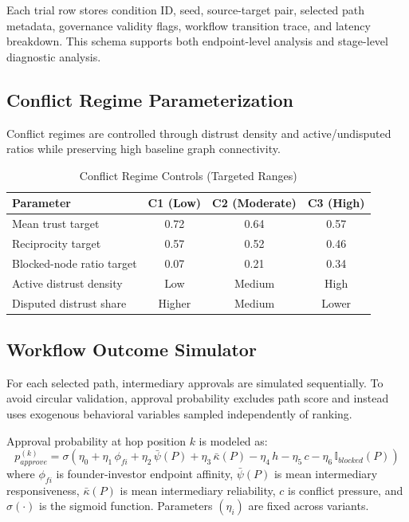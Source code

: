 \documentclass[conference]{IEEEtran}
\begin{document}
Each trial row stores condition ID, seed, source-target pair, selected path metadata, governance validity flags, workflow transition trace, and latency breakdown. This schema supports both endpoint-level analysis and stage-level diagnostic analysis.

\subsection{Conflict Regime Parameterization}
Conflict regimes are controlled through distrust density and active/undisputed ratios while preserving high baseline graph connectivity.

\begin{table}[htbp]
\caption{Conflict Regime Controls (Targeted Ranges)}
\label{tab:conflict_regimes}
\centering
\begin{tabular}{lccc}
\toprule
Parameter & C1 (Low) & C2 (Moderate) & C3 (High) \\
\midrule
Mean trust target & 0.72 & 0.64 & 0.57 \\
Reciprocity target & 0.57 & 0.52 & 0.46 \\
Blocked-node ratio target & 0.07 & 0.21 & 0.34 \\
Active distrust density & Low & Medium & High \\
Disputed distrust share & Higher & Medium & Lower \\
\bottomrule
\end{tabular}
\end{table}

\subsection{Workflow Outcome Simulator}
For each selected path, intermediary approvals are simulated sequentially. To avoid circular validation, approval probability excludes path score and instead uses exogenous behavioral variables sampled independently of ranking.

Approval probability at hop position $k$ is modeled as:
\begin{equation}
p_{approve}^{(k)}=\sigma\left(\eta_0+\eta_1\,\phi_{fi}+\eta_2\,\bar{\psi}(P)+\eta_3\,\bar{\kappa}(P)-\eta_4\,h-\eta_5\,c-\eta_6\,\mathbb{I}_{blocked}(P)\right)
\end{equation}
where $\phi_{fi}$ is founder-investor endpoint affinity, $\bar{\psi}(P)$ is mean intermediary responsiveness, $\bar{\kappa}(P)$ is mean intermediary reliability, $c$ is conflict pressure, and $\sigma(\cdot)$ is the sigmoid function. Parameters $(\eta_i)$ are fixed across variants.
\end{document}
